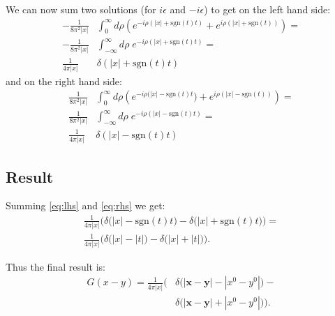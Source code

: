 \documentclass[aps,prd,final,twocolumn,floats,floatfix,nofootinbib,10pt]{revtex4-1}
\begin{document}
We can now sum two solutions (for $i \epsilon$ and $-i \epsilon$) to get on the left hand side:
\begin{align}
-\frac{1}{8 \pi^2 |x|} & \int_0^\infty d\rho \left( e^{-i \rho (|x| + \text{sgn}(t) t)} + e^{i \rho (|x| + \text{sgn}(t))} \right) = \\
-\frac{1}{8 \pi^2 |x|} & \int_{-\infty}^\infty d\rho \; e^{-i \rho (|x| + \text{sgn}(t) t)} = \\
\frac{1}{4 \pi |x|} &  \delta \left( |x| + \text{sgn}(t) t \right) \label{eq:lhs}
\end{align}
and on the right hand side:
\begin{align}
\frac{1}{8 \pi^2 |x|} & \int_0^\infty d\rho \left( e^{-i \rho (|x| - \text{sgn}(t) t}) + e^{i \rho (|x| - \text{sgn}(t))} \right) = \\
\frac{1}{8 \pi^2 |x|} & \int_{-\infty}^\infty d\rho \; e^{-i \rho (|x| - \text{sgn}(t) t)} = \\
\frac{1}{4 \pi |x|} & \delta \left( |x| - \text{sgn}(t) t \right) \label{eq:rhs}
\end{align}

\subsection{Result}

Summing \eqref{eq:lhs} and \eqref{eq:rhs} we get:
\begin{align}
\frac{1}{4 \pi |x|} \Big( \delta \big( |x| - \text{sgn}\left(t\right) t \big) -
  \delta \big( |x| + \text{sgn}\left(t\right) t \big) \Big) = \\
\frac{1}{4 \pi |x|} \Big( \delta \big( |x| - |t| \big) - \delta \big( |x| + |t| \big) \Big).
\end{align}

Thus the final result is:
\begin{align}
G(x - y) = \frac{1}{4 \pi |x|} \Big( & \delta \big( |\mathbf{x} - \mathbf{y}| - |x^0 - y^0| \big) - \\
& \delta \big( |\mathbf{x} - \mathbf{y}| + |x^0 - y^0| \big) \Big).
\end{align}
\end{document}
